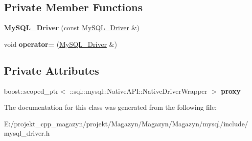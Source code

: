 \subsection*{Private Member Functions}
\begin{DoxyCompactItemize}
\item 
\hypertarget{classsql_1_1mysql_1_1_my_s_q_l___driver_a05b8667fbe350ca63151f9d3ca7e6384}{}\label{classsql_1_1mysql_1_1_my_s_q_l___driver_a05b8667fbe350ca63151f9d3ca7e6384} 
{\bfseries My\+S\+Q\+L\+\_\+\+Driver} (const \hyperlink{classsql_1_1mysql_1_1_my_s_q_l___driver}{My\+S\+Q\+L\+\_\+\+Driver} \&)
\item 
\hypertarget{classsql_1_1mysql_1_1_my_s_q_l___driver_a1e2751b67245d1d307d5f3ed31620434}{}\label{classsql_1_1mysql_1_1_my_s_q_l___driver_a1e2751b67245d1d307d5f3ed31620434} 
void {\bfseries operator=} (\hyperlink{classsql_1_1mysql_1_1_my_s_q_l___driver}{My\+S\+Q\+L\+\_\+\+Driver} \&)
\end{DoxyCompactItemize}
\subsection*{Private Attributes}
\begin{DoxyCompactItemize}
\item 
\hypertarget{classsql_1_1mysql_1_1_my_s_q_l___driver_a25d9763be9bb3b0b1364caf83dc03e38}{}\label{classsql_1_1mysql_1_1_my_s_q_l___driver_a25d9763be9bb3b0b1364caf83dc03e38} 
boost\+::scoped\+\_\+ptr$<$ \+::sql\+::mysql\+::\+Native\+A\+P\+I\+::\+Native\+Driver\+Wrapper $>$ {\bfseries proxy}
\end{DoxyCompactItemize}


The documentation for this class was generated from the following file\+:\begin{DoxyCompactItemize}
\item 
E\+:/projekt\+\_\+cpp\+\_\+magazyn/projekt/\+Magazyn/\+Magazyn/\+Magazyn/mysql/include/mysql\+\_\+driver.\+h\end{DoxyCompactItemize}
